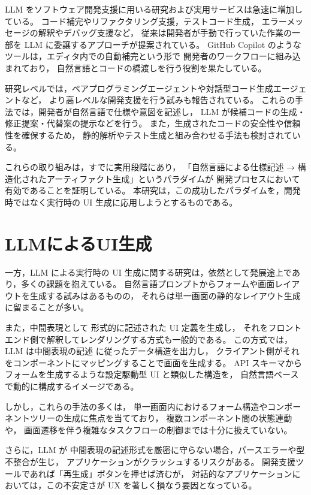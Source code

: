 \documentclass[senior,final,11pt,dvipdfmx]{iputit-thesis}
\begin{document}
LLM をソフトウェア開発支援に用いる研究および実用サービスは急速に増加している。
コード補完やリファクタリング支援，テストコード生成，
エラーメッセージの解釈やデバッグ支援など，
従来は開発者が手動で行っていた作業の一部を LLM に委譲するアプローチが提案されている。
GitHub Copilot のようなツールは，エディタ内での自動補完という形で
開発者のワークフローに組み込まれており，
自然言語とコードの橋渡しを行う役割を果たしている\cite{uiuc2025copilot}。

研究レベルでは，ペアプログラミングエージェントや対話型コード生成エージェントなど，
より高レベルな開発支援を行う試みも報告されている。
これらの手法では，開発者が自然言語で仕様や意図を記述し，
LLM が候補コードの生成・修正提案・代替案の提示などを行う。
また，生成されたコードの安全性や信頼性を確保するため，
静的解析やテスト生成と組み合わせる手法も検討されている\cite{cognition2025devin}。

これらの取り組みは，すでに実用段階にあり，
「自然言語による仕様記述 → 構造化されたアーティファクト生成」というパラダイムが
開発プロセスにおいて有効であることを証明している。
本研究は，この成功したパラダイムを，開発時ではなく実行時の UI 生成に応用しようとするものである。

\section{LLMによるUI生成}

一方，LLM による実行時の UI 生成に関する研究は，依然として発展途上であり，多くの課題を抱えている。
自然言語プロンプトからフォームや画面レイアウトを生成する試み\cite{wu2024uicoder}はあるものの，
それらは単一画面の静的なレイアウト生成に留まることが多い。

また，中間表現として 形式的に記述された UI 定義を生成し，
それをフロントエンド側で解釈してレンダリングする方式も一般的である。
この方式では，LLM は中間表現の記述
に従ったデータ構造を出力し，
クライアント側がそれをコンポーネントにマッピングすることで画面を生成する。
API スキーマからフォームを生成するような設定駆動型 UI と類似した構造を，
自然言語ベースで動的に構成するイメージである\cite{chang2025generative}。

しかし，これらの手法の多くは，
単一画面内におけるフォーム構造やコンポーネントツリーの生成に焦点を当てており，
複数コンポーネント間の状態連動や，
画面遷移を伴う複雑なタスクフローの制御までは十分に扱えていない。

さらに，LLM が 中間表現の記述形式を厳密に守らない場合，パースエラーや型不整合が生じ，
アプリケーションがクラッシュするリスクがある。
開発支援ツールであれば「再生成」ボタンを押せば済むが，
対話的なアプリケーションにおいては，この不安定さが UX を著しく損なう要因となっている。
\end{document}
